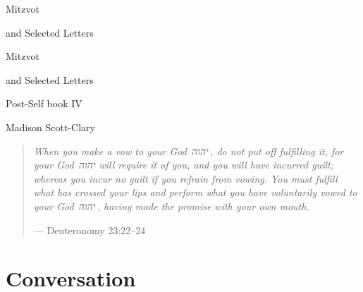 \documentclass[11pt]{memoir}
\begin{document}
  \frontmatter

  \thispagestyle{empty}
  \null
  \vfill
  \begin{flushright}
    \DisplayFont Mitzvot
    
    \vspace{1ex}

    {\footnotesize and Selected Letters}
  \end{flushright}
  \vfill
  \cleardoublepage

  \pagestyle{plain}

  \doublespacing

  \begin{flushright}
    \null
    \vfill
    {\Huge\DisplayFont Mitzvot}

    \vspace{1ex}

    {\Large\DisplayFont and Selected Letters}

    {\DisplayFont Post-Self book IV}

    \vfill

    {\Large\DisplayFont Madison Scott-Clary}
  \end{flushright}
  \thispagestyle{empty}

  \newpage

  

  \tableofcontents*
  \newpage
  \null
  \cleardoublepage



  \mainmatter

  \pagestyle{ourbook}

  \cleardoublepage
  \null
  \thispagestyle{empty}
  \vfill
  \begin{quote}
    \small
    \emph{When you make a vow to your God~{\HebFont יהוה}\,, do not put off fulfilling it, for your God~{\HebFont יהוה} will require it of you, and you will have incurred guilt; whereas you incur no guilt if you refrain from vowing. You must fulfill what has crossed your lips and perform what you have voluntarily vowed to your God~{\HebFont יהוה}\,, having made the promise with your own mouth.}

    --- Deuteronomy 23:22--24
  \end{quote}
  \vfill

  \part{Conversation}
\end{document}
